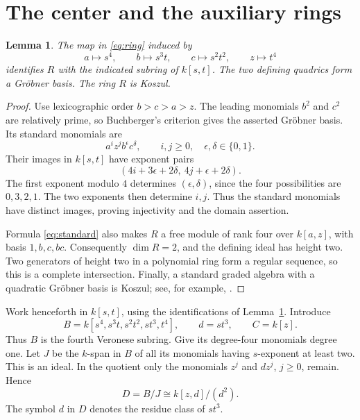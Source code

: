 \documentclass[11pt]{article}
\newtheorem{lemma}[theorem]{Lemma}
\theoremstyle{remark}
\begin{document}
\section{The center and the auxiliary rings}

\begin{lemma}\label{lem:ring}
The map in \eqref{eq:ring} induced by
\[
 a\longmapsto s^4,\qquad b\longmapsto s^3t,\qquad
 c\longmapsto s^2t^2,\qquad z\longmapsto t^4
\]
identifies $R$ with the indicated subring of $k[s,t]$. The two defining quadrics form a Gr\"obner basis. The ring $R$ is Koszul.
\end{lemma}
\begin{proof}
Use lexicographic order $b>c>a>z$. The leading monomials $b^2$ and $c^2$ are relatively prime, so Buchberger's criterion gives the asserted Gr\"obner basis. Its standard monomials are
\begin{equation}\label{eq:standard}
 a^i z^j b^\epsilon c^\delta,
 \qquad i,j\geq0,\quad \epsilon,\delta\in\{0,1\}.
\end{equation}
Their images in $k[s,t]$ have exponent pairs
\[
 (4i+3\epsilon+2\delta,\ 4j+\epsilon+2\delta).
\]
The first exponent modulo $4$ determines $(\epsilon,\delta)$, since the four possibilities are $0,3,2,1$. The two exponents then determine $i,j$. Thus the standard monomials have distinct images, proving injectivity and the domain assertion.

Formula \eqref{eq:standard} also makes $R$ a free module of rank four over $k[a,z]$, with basis $1,b,c,bc$. Consequently $\dim R=2$, and the defining ideal has height two. Two generators of height two in a polynomial ring form a regular sequence, so this is a complete intersection. Finally, a standard graded algebra with a quadratic Gr\"obner basis is Koszul; see, for example, \cite[Section 1]{Conca}.
\end{proof}

Work henceforth in $k[s,t]$, using the identifications of Lemma~\ref{lem:ring}. Introduce
\begin{equation}\label{eq:auxiliary}
 B=k[s^4,s^3t,s^2t^2,st^3,t^4],\qquad d=st^3,\qquad C=k[z].
\end{equation}
Thus $B$ is the fourth Veronese subring. Give its degree-four monomials degree one. Let $J$ be the $k$-span in $B$ of all its monomials having $s$-exponent at least two. This is an ideal. In the quotient only the monomials $z^j$ and $dz^j$, $j\geq0$, remain. Hence
\begin{equation}\label{eq:diagram}
 D=B/J\cong k[z,d]/(d^2).
\end{equation}
The symbol $d$ in $D$ denotes the residue class of $st^3$.
\end{document}
